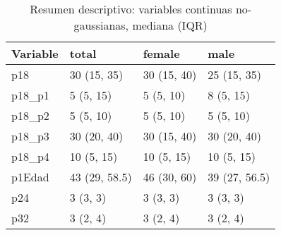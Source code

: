 \begin{table}

\caption{Resumen descriptivo: variables continuas no-gaussianas, mediana (IQR)}
\centering
\begin{tabular}[t]{l|l|l|l}
\hline
Variable & total & female & male\\
\hline
p18 & 30 (15, 35) & 30 (15, 40) & 25 (15, 35)\\
\hline
p18\_p1 & 5 (5, 15) & 5 (5, 10) & 8 (5, 15)\\
\hline
p18\_p2 & 5 (5, 10) & 5 (5, 10) & 5 (5, 10)\\
\hline
p18\_p3 & 30 (20, 40) & 30 (15, 40) & 30 (20, 40)\\
\hline
p18\_p4 & 10 (5, 15) & 10 (5, 15) & 10 (5, 15)\\
\hline
p1Edad & 43 (29, 58.5) & 46 (30, 60) & 39 (27, 56.5)\\
\hline
p24 & 3 (3, 3) & 3 (3, 3) & 3 (3, 3)\\
\hline
p32 & 3 (2, 4) & 3 (2, 4) & 3 (2, 4)\\
\hline
\end{tabular}
\end{table}
